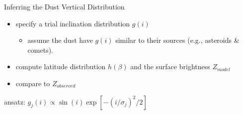 \documentclass[20pt,35mmSlide,landscape]{foils}
\begin{document}
\newpage
\pagecolor{light-yellow}
\normalsize

\vspace*{-1in}\begin{center}
{\large Inferring the Dust Vertical Distribution}
\end{center}

\begin{itemize}

\item specify a trial inclination distribution $g(i)$

\begin{itemize}

\item assume the dust have $g(i)$ similar to their sources
     (e.g., asteroids \& comets).

\end{itemize}

\item compute latitude distribution $h(\beta)$ and
      the surface brightness $Z_{model}$

\item compare to $Z_{observed}$

\end{itemize}
\nopagebreak
\pagecolor{light-yellow}
\small
\vspace*{-2in}\hspace*{-0.7in}\parbox{11in}{
\parbox{5.5in}{
\begin{figure}[t]
\vspace*{-1ex}
\end{figure}
\begin{center}
{\normalsize ansatz: $g_j(i)\propto\sin(i)
\exp[-(i/\sigma_j)^2/2]$\vspace*{-3ex}}
\end{center}
\begin{figure}
\end{figure}
}
\parbox{5.5in}{
\begin{figure}[t]
\end{figure}
\begin{center}
{\tiny \ \vspace*{-3ex}}
\end{center}
\begin{figure}
\end{figure}
}
}
\end{document}
